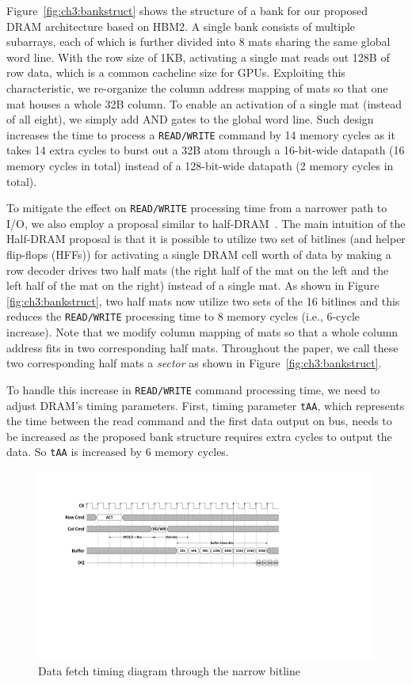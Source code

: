 Figure~\ref{fig:ch3:bankstruct} 
shows the structure of a bank for our proposed DRAM architecture based on HBM2. A single bank consists of multiple subarrays, each of which is further divided into 8 mats sharing the same global word line. With the row size of 1KB, activating a single mat reads out 128B of row data, which is a common cacheline size for GPUs. Exploiting this characteristic, we re-organize the column address mapping of mats so that one mat houses a whole 32B column. To enable an activation of a single mat (instead of all eight), we simply add AND gates to the global word line. Such design increases the time to process a {\tt READ/WRITE} command by 14 memory cycles as it takes 14 extra cycles to burst out a 32B atom through a 16-bit-wide datapath (16 memory cycles in total) instead of a 128-bit-wide datapath (2 memory cycles in total).

To mitigate the effect on {\tt READ/WRITE} processing time from a narrower path to I/O, we also employ a proposal similar to half-DRAM~. The main intuition of the Half-DRAM proposal is that it is possible to utilize two set of bitlines (and helper flip-flops (HFFs)) for activating a single DRAM cell worth of data by making a row decoder drives two half mats (the right half of the mat on the left and the left half of the mat on the right) instead of a single mat. As shown in Figure \ref{fig:ch3:bankstruct}, two half mats now utilize two sets of the 16 bitlines and this reduces the {\tt READ/WRITE} processing time to 8 memory cycles (i.e., 6-cycle increase). Note that we modify column mapping of mats so that a whole column address fits in two corresponding half mats. Throughout the paper, we call these two corresponding half mats a {\it sector} as shown in Figure~\ref{fig:ch3:bankstruct}.

To handle this increase in {\tt READ/WRITE} command processing time, we need to adjust DRAM's timing parameters. First, timing parameter {\tt tAA}, which represents the time between the read command and the first data output on bus, needs to be increased as the proposed bank structure requires extra cycles to output the data.  So {\tt tAA} is increased by 6 memory cycles. 
\begin{figure}[t]
    \centering
        \includegraphics[width=\linewidth]{figure/data_fetch_time.pdf}
    \caption{Data fetch timing diagram through the narrow bitline}
    \label{fig:ch3:datfetch}
\end{figure}

